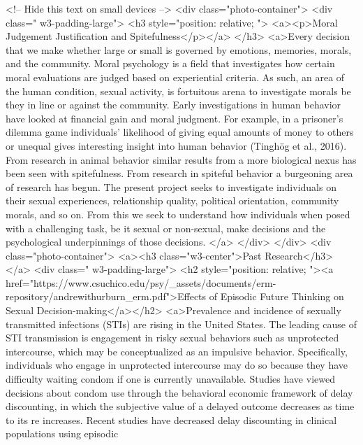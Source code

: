             <!-- Hide this text on small devices -->
            <div class="photo-container">
            <div class=" w3-padding-large">
                <h3 style="position: relative; ">
                    <a><p>Moral Judgement Justification and Spitefulness</p></a>
                </h3>
                <a>Every decision that we make whether large or small is governed by emotions, memories, morals, and the community. Moral psychology is a field that investigates how certain moral evaluations are judged based on experiential criteria. As
                    such, an area of the human condition, sexual activity, is fortuitous arena to investigate morals be they in line or against the community. Early investigations in human behavior have looked at financial gain and moral judgment. For
                    example, in a prisoner's dilemma game individuals' likelihood of giving equal amounts of money to others or unequal gives interesting insight into human behavior (Tinghög et al., 2016). From research in animal behavior similar results
                    from a more biological nexus has been seen with spitefulness. From research in spiteful behavior a burgeoning area of research has begun. The present project seeks to investigate individuals on their sexual experiences, relationship
                    quality, political orientation, community morals, and so on. From this we seek to understand how individuals when posed with a challenging task, be it sexual or non-sexual, make decisions and the psychological underpinnings of those
                    decisions.
                </a>
            </div>
            </div>
            <div class="photo-container">
            <a><h3 class="w3-center">Past Research</h3></a>
            <div class=" w3-padding-large">
                <h2 style="position: relative; "><a href="https://www.csuchico.edu/psy/_assets/documents/erm-repository/andrewithurburn_erm.pdf">Effects of Episodic Future Thinking on Sexual Decision-making</a></h2>
                <a>Prevalence and incidence of sexually transmitted infections (STIs) are rising in the United States. The leading cause of STI transmission is engagement in risky sexual behaviors such as unprotected intercourse, which may be conceptualized
                    as an impulsive behavior. Specifically, individuals who engage in unprotected intercourse may do so because they have difficulty waiting condom if one is currently unavailable. Studies have viewed decisions about condom use through
                    the behavioral economic framework of delay discounting, in which the subjective value of a delayed outcome decreases as time to its re increases. Recent studies have decreased delay discounting in clinical populations using episodic
